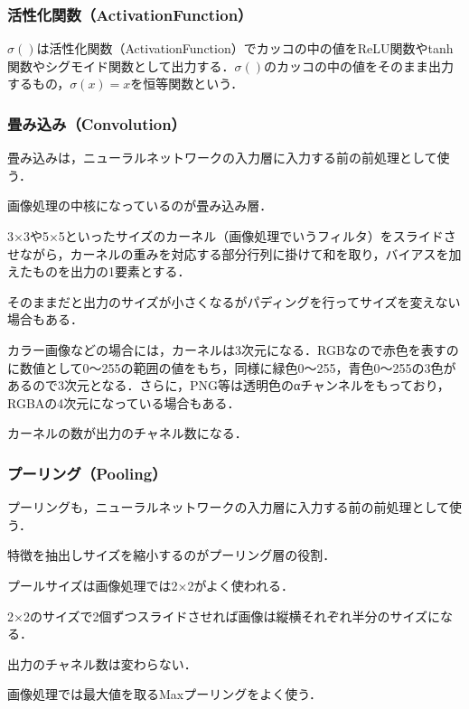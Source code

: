 \documentclass[uplatex,titlepage]{jsarticle}
\newif\iffigure
\begin{document}
\subsubsection{活性化関数（ActivationFunction）}
$\sigma()$は活性化関数（ActivationFunction）でカッコの中の値をReLU関数やtanh関数やシグモイド関数として出力する．$\sigma()$のカッコの中の値をそのまま出力するもの，$\sigma(x)=x$を恒等関数という．
\iffigure
\begin{figure}[H]%
    \begin{center}
    \texttt{[image: actication\_function.png]} 
    \caption{活性化関数}
    \end{center}
\end{figure}
\fi

\subsubsection{畳み込み（Convolution）}
畳み込みは，ニューラルネットワークの入力層に入力する前の前処理として使う．
\iffigure
\begin{figure}[H]%
    \begin{center}
    \texttt{[image: convolution\_model.png]} 
    \caption{畳み込みのイメージ}
    \end{center}
\end{figure}
\fi
画像処理の中核になっているのが畳み込み層．\par
3×3や5×5といったサイズのカーネル（画像処理でいうフィルタ）をスライドさせながら，カーネルの重みを対応する部分行列に掛けて和を取り，バイアスを加えたものを出力の1要素とする．\par
そのままだと出力のサイズが小さくなるがパディングを行ってサイズを変えない場合もある．\par
カラー画像などの場合には，カーネルは3次元になる．RGBなので赤色を表すのに数値として0～255の範囲の値をもち，同様に緑色0～255，青色0～255の3色があるので3次元となる．さらに，PNG等は透明色のαチャンネルをもっており，RGBAの4次元になっている場合もある．\par
カーネルの数が出力のチャネル数になる．

\subsubsection{プーリング（Pooling）}
プーリングも，ニューラルネットワークの入力層に入力する前の前処理として使う．
\iffigure
\begin{figure}[H]%
    \begin{center}
    \texttt{[image: pooling\_model.png]} 
    \caption{プーリングのイメージ}
    \end{center}
\end{figure}
\fi
特徴を抽出しサイズを縮小するのがプーリング層の役割．\par
プールサイズは画像処理では2×2がよく使われる．\par
2×2のサイズで2個ずつスライドさせれば画像は縦横それぞれ半分のサイズになる．\par
出力のチャネル数は変わらない．\par
画像処理では最大値を取るMaxプーリングをよく使う．
\end{document}
